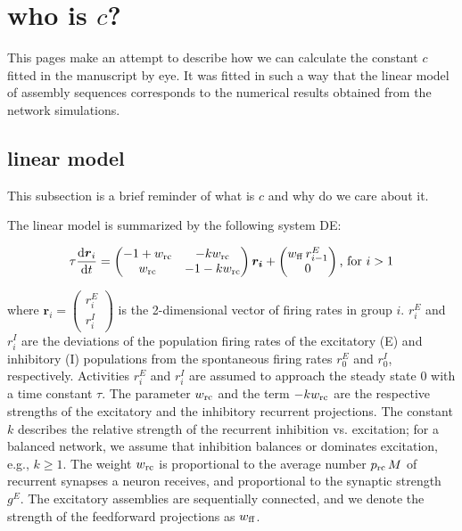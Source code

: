 \section{who is $c$?}

This pages make an attempt to describe how we can calculate the constant $c$ fitted in the manuscript by eye.
It was fitted in such a way that the linear model of assembly sequences corresponds to the numerical results obtained from the network simulations.

\subsection{linear model}
  This subsection is a brief reminder of what is $c$ and why do we care about it.

  The linear model is summarized by the following system DE:

  \begin{equation}
  \tau \frac{\text{d} \boldsymbol{r}_{i}}{\text{d}t} =  \begin{pmatrix} -1+w_{\rm rc} &-kw_{\rm rc} \\ w_{\rm rc} &-1-kw_{\rm rc}\\ \end{pmatrix}\boldsymbol{r_{i}} + \begin{pmatrix} w_{\rm ff} \, r_{i-1}^E \\ 0 \end{pmatrix} \text{, for $i>1$}
    \label{eq:EI_coupled}
  \end{equation}

  where $\boldsymbol{r}_i = \begin{pmatrix} r_i^E \\ r_i^I \end{pmatrix}$ is the 2-dimensional vector of firing rates in group $i$.
  $r_{i}^E$ and $r_{i}^I$ are the deviations of the population firing rates of the excitatory (E) and inhibitory (I) populations from the spontaneous firing rates $r_0^E$ and $r_0^I$, respectively.
  Activities $r_{i}^E$ and $r_{i}^I$ are assumed to approach the steady state $0$ with a time constant $\tau$.
  The parameter $w_{\rm rc}$ and the term $-kw_{\rm rc}$ are the respective strengths of the excitatory and the inhibitory recurrent projections.
  The constant $k$ describes the relative strength of the recurrent inhibition vs. excitation; for a balanced network, we assume that inhibition balances or dominates excitation, e.g., $k \geq 1$.
  The weight $w_{\rm rc}$ is proportional to the average number $p_{\rm rc} \, M$ of recurrent synapses a neuron receives, and proportional to the synaptic strength $g^E$.
  The excitatory assemblies are sequentially connected, and we denote the strength of the feedforward projections as $w_{\rm ff}$.

